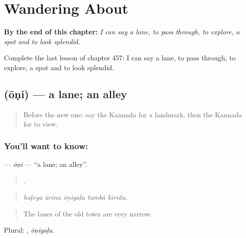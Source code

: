 
\chapter{Wandering About}
\label{ch:ka-wandering-about}

\begin{chapteropening}
\textbf{By the end of this chapter:} \emph{I can say a lane, to pass through, to explore, a spot and to look splendid.}

Complete the last lesson of chapter 457: I can say a lane, to pass through, to explore, a spot and to look splendid.
\end{chapteropening}

\section[\texorpdfstring{\kn{ಓಣಿ} (ōṇi)}{ಓಣಿ (ōṇi)}]{ (ōṇi) — a lane; an alley}

\label{lesson:KA-C457-oni}



\begin{quote}
Before the new one: say the Kannada for a landmark, then the Kannada for to view.
\end{quote}

\subsection*{You'll want to know: }
\textbf{} — \emph{ōṇi} — \textquotedblleft{}a lane; an alley\textquotedblright{}.

\begin{quote}
    .
\end{quote}

\begin{quote}
\emph{haḷeya ūrina ōṇigaḷu tumbā kiridu.}
\end{quote}

\begin{quote}
The lanes of the old town are very narrow.
\end{quote}

Plural: , \emph{ōṇigaḷu}.

